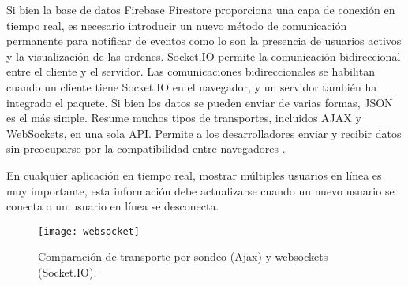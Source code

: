 Si bien la base de datos Firebase Firestore proporciona una capa de conexión en tiempo real, es necesario introducir un nuevo método de comunicación permanente para notificar de eventos como lo son la presencia de usuarios activos y la visualización de las ordenes. Socket.IO permite la comunicación bidireccional entre el cliente y el servidor. Las comunicaciones bidireccionales se habilitan cuando un cliente tiene Socket.IO en el navegador, y un servidor también ha integrado el paquete. Si bien los datos se pueden enviar de varias formas, JSON es el más simple. Resume muchos tipos de transportes, incluidos AJAX y WebSockets, en una sola API. Permite a los desarrolladores enviar y recibir datos sin preocuparse por la compatibilidad entre navegadores \cite{kelleher}.
\vspace{0.8cm}

En cualquier aplicación en tiempo real, mostrar múltiples usuarios en línea es muy importante, esta información debe actualizarse cuando un nuevo usuario se conecta o un usuario en línea se desconecta.
\vspace{0.8cm}

\begin{figure}[H]
  \centering
  \texttt{[image: websocket]}
  \caption{Comparación de transporte por sondeo (Ajax) y websockets (Socket.IO).}
\end{figure}


